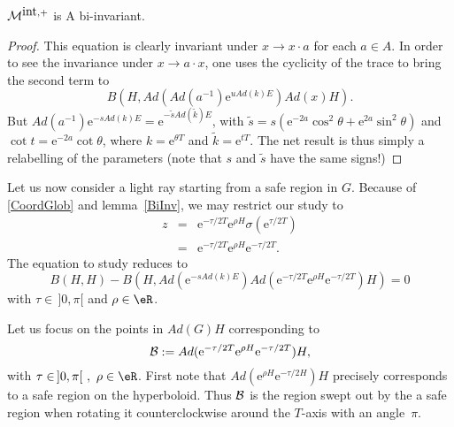 \begin{lemma}
	${\cal M}^{\mbox{int},+}$ is A bi-invariant.
	\label{BiInv}
\end{lemma}
\begin{proof}
	This equation is clearly invariant under $x \to x\cdot a$ for each $a\in A$. In order to see the invariance under $x \to a\cdot x$, one uses the cyclicity of the trace to bring the second term to
	\[
		B(H,Ad(Ad(a^{-1})\mbox{e}^{u Ad(k)E}) Ad(x) H).
	\]
	But $Ad(a^{-1})\mbox{e}^{-s Ad(k)E} = \mbox{e}^{-\tilde{s} Ad(\tilde{k})E}$, with $\tilde{s} = s (\mbox{e}^{-2a} \cos^2\theta + \mbox{e}^{2a} \sin^2 \theta)$ and $\cot t = \mbox{e}^{-2a} \cot \theta$, where $k = \mbox{e}^{\theta T}$ and $\tilde{k}=\mbox{e}^{t T}$. The net result is thus simply a relabelling of the parameters (note that $s$ and $\tilde{s}$ have the same signs!)
\end{proof}

Let us now consider a light ray starting from a safe region in $G$. Because of \eqref{CoordGlob} and lemma~\ref{BiInv}, we may restrict our study to
\begin{eqnarray}
	z &=& \mbox{e}^{-\tau/2 T} \mbox{e}^{\rho H} \sigma(\mbox{e}^{\tau/2 T}) \\
	&=& \mbox{e}^{-\tau/2 T} \mbox{e}^{\rho H} \mbox{e}^{-\tau/2 T}.
\end{eqnarray}
The equation to study reduces to
\begin{equation}\label{EqHoriz2}
	B(H,H) - B(H,Ad(\mbox{e}^{-s Ad(k)E}) Ad(\mbox{e}^{-\tau/2 T}
	\mbox{e}^{\rho H} \mbox{e}^{-\tau/2 T}) H) = 0
\end{equation}
with $\tau\in \, ]0,\pi[$ and  $\rho \in \eR$.

			Let us focus on the points in $Ad(G)H$ corresponding to
			\[
				{\cal B}:= Ad(\mbox{e}^{-\tau/2 T} \mbox{e}^{\rho H} \mbox{e}^{-\tau/2 T})H,
			\]
			with $\tau \in \, ]0,\pi[ \,\, , \,\, \rho \in \eR$. First note that $Ad(\mbox{e}^{\rho H} \mbox{e}^{-\tau/2 H}) H$ precisely corresponds to a safe region on the hyperboloid. Thus ${\cal B}$ is the region swept out by the a safe region when rotating it counterclockwise around the $T$-axis with an angle~$\pi$.

